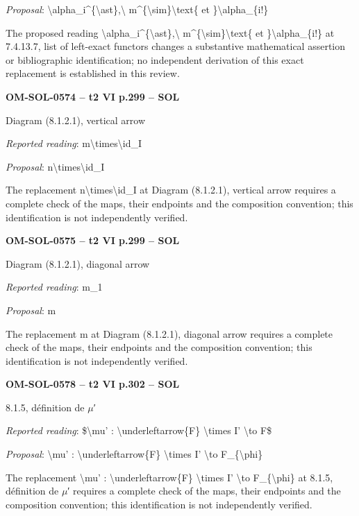 \emph{Proposal}: \textbackslash{}alpha\_i\textasciicircum{}\{\textbackslash{}ast\},\textbackslash{} m\textasciicircum{}\{\textbackslash{}sim\}\textbackslash{}text\{ et \}\textbackslash{}alpha\_\{i!\}\par
The proposed reading \textbackslash{}alpha\_i\textasciicircum{}\{\textbackslash{}ast\},\textbackslash{} m\textasciicircum{}\{\textbackslash{}sim\}\textbackslash{}text\{ et \}\textbackslash{}alpha\_\{i!\} at 7.4.13.7, list of left-exact functors changes a substantive mathematical assertion or bibliographic identification; no independent derivation of this exact replacement is established in this review.\par
\par\noindent\textbf{OM-SOL-0574 -- t2 VI p.299 -- SOL}\par
Diagram (8.1.2.1), vertical arrow\par
\emph{Reported reading}: m\textbackslash{}times\textbackslash{}id\_I\par
\emph{Proposal}: n\textbackslash{}times\textbackslash{}id\_I\par
The replacement n\textbackslash{}times\textbackslash{}id\_I at Diagram (8.1.2.1), vertical arrow requires a complete check of the maps, their endpoints and the composition convention; this identification is not independently verified.\par
\par\noindent\textbf{OM-SOL-0575 -- t2 VI p.299 -- SOL}\par
Diagram (8.1.2.1), diagonal arrow\par
\emph{Reported reading}: m\_1\par
\emph{Proposal}: m\par
The replacement m at Diagram (8.1.2.1), diagonal arrow requires a complete check of the maps, their endpoints and the composition convention; this identification is not independently verified.\par
\par\noindent\textbf{OM-SOL-0578 -- t2 VI p.302 -- SOL}\par
8.1.5, définition de \ensuremath{\mu}′\par
\emph{Reported reading}: \$\textbackslash{}mu' : \textbackslash{}underleftarrow\{F\} \textbackslash{}times I' \textbackslash{}to F\$\par
\emph{Proposal}: \textbackslash{}mu' : \textbackslash{}underleftarrow\{F\} \textbackslash{}times I' \textbackslash{}to F\_\{\textbackslash{}phi\}\par
The replacement \textbackslash{}mu' : \textbackslash{}underleftarrow\{F\} \textbackslash{}times I' \textbackslash{}to F\_\{\textbackslash{}phi\} at 8.1.5, définition de \ensuremath{\mu}′ requires a complete check of the maps, their endpoints and the composition convention; this identification is not independently verified.\par
